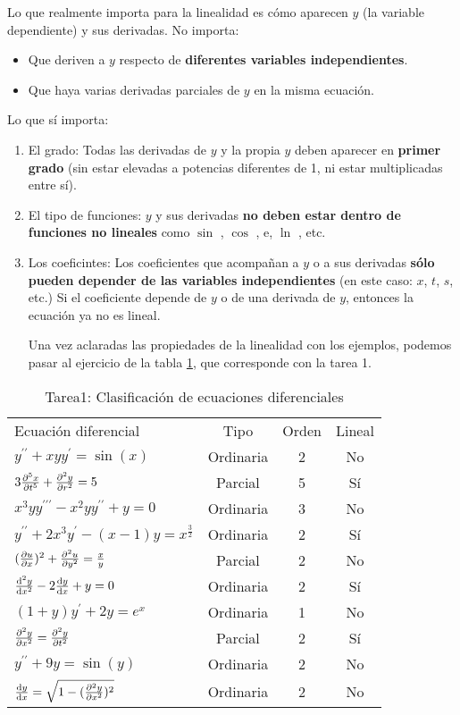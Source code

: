 \documentclass[12pt]{article} %
\begin{document}
Lo que realmente importa para la linealidad es cómo aparecen $y$ (la variable dependiente) y sus derivadas.
No importa: 
\begin{itemize}
  \item Que deriven a $y$ respecto de \textbf{diferentes variables independientes}.
  \item Que haya varias derivadas parciales de $y$ en la misma ecuación.
\end{itemize}
Lo que sí importa:
\begin{enumerate}
\item El grado: Todas las derivadas de $y$ y la propia $y$ deben aparecer en \textbf{primer grado} (sin estar elevadas a potencias diferentes de 1, ni estar multiplicadas entre sí).
\item El tipo de funciones: $y$ y sus derivadas \textbf{no deben estar dentro de funciones no lineales} como $\sin$ , $\cos$ , e, $\ln$ , etc.
\item Los coeficintes: Los coeficientes que acompañan a $y$ o a sus derivadas \textbf{sólo pueden depender de las variables independientes} (en este caso: $x$, $t$, $s$, etc.)
Si el coeficiente depende de $y$ o de una derivada de $y$, entonces la ecuación ya no es lineal.

Una vez aclaradas las propiedades de la linealidad con los ejemplos, podemos pasar al ejercicio de la tabla \ref{tab:EjercicioClasificacion}, que corresponde con la tarea 1.
\end{enumerate}

\begin{table}
  \centering
  \caption{Tarea1: Clasificación de ecuaciones diferenciales}
  \label{tab:EjercicioClasificacion}
  \begin{tabular}{lccc}
    Ecuación diferencial & Tipo & Orden & Lineal \\[0.5em]
    $y^{\prime \prime} + xyy^{\prime} = \sin (x)$ & Ordinaria & 2 & No \\[0.6em]
    $3 \pdv[5]{x}{t} + \pdv[2]{y}{r} = 5$ & Parcial & 5 & Sí \\[0.6em]
    $x^3yy^{\prime \prime \prime} - x^2yy^{\prime \prime} + y = 0$ & Ordinaria & 3 & No \\[0.6em]
    $y^{\prime \prime} + 2x^3y^{\prime} - (x-1)y = x^{\frac{3}{2}}$ & Ordinaria & 2 & Sí \\[0.6em]
    $(\pdv{u}{x})^2 + \pdv[2]{u}{y} = \frac{x}{y}$ &Parcial & 2 & No \\[0.6em]
    $\dv[2]{y}{x} - 2 \dv{y}{x} + y = 0$ & Ordinaria & 2 & Sí \\[0.6em]
    $(1+y)y^{\prime} + 2y = e^x$ & Ordinaria & 1 & No \\[0.6em]
    $\pdv[2]{y}{x} = \pdv[2]{y}{t}$ & Parcial & 2 & Sí \\[0.6em]
    $y^{\prime \prime} + 9y = \sin (y)$ & Ordinaria & 2 & No \\[0.6em]
    $\dv{y}{x} = \sqrt{1 - (\pdv[2]{y}{x})^2}$ & Ordinaria & 2 & No
  \end{tabular}
\end{table}
\end{document}

